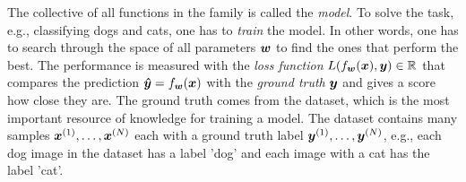 		The collective of all functions in the family is called the \emph{model}.
		To solve the task, e.g., classifying dogs and cats, one has to \emph{train} the model.
		In other words, one has to search through the space of all parameters $\bm{w}$ to find the ones that perform the best.
		The performance is measured with the \emph{loss function} 
		$L(f_{\bm{w}}(\bm{x}), \bm{y}) \in \mathbb{R}$ that compares the prediction 
		$\bm{\hat{y}} = f_{\bm{w}}(\bm{x})$ with the \emph{ground truth} $\bm{y}$ and gives a score how close they are.
		The ground truth comes from the dataset, which is the most important resource of knowledge for training a model.
		The dataset contains many samples $\bm{x}^{(1)}, \dots, \bm{x}^{(N)}$ each with a ground truth label 
		$\bm{y}^{(1)}, \dots, \bm{y}^{(N)}$, e.g., each dog image in the dataset has a label 'dog' and each image with a cat has the label 'cat'.
		
